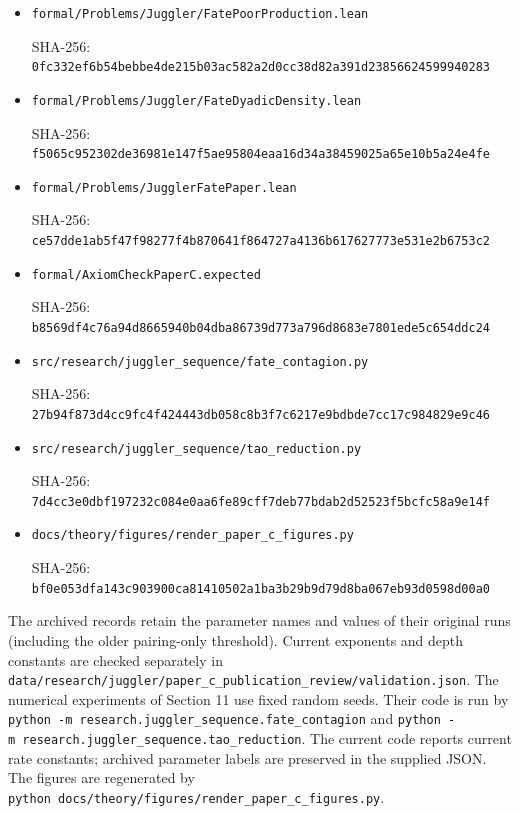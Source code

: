 \documentclass[11pt,a4paper]{article}
\begin{document}
\begin{itemize}
  SHA-256:
  \texttt{\nolinkurl{773c579e2ba303dc49f1488020ea142b0b35ea26573707ebfd6afca7c4dd284b}}
\item
  \texttt{\nolinkurl{formal/Problems/Juggler/FatePoorProduction.lean}}

  SHA-256:
  \texttt{\nolinkurl{0fc332ef6b54bebbe4de215b03ac582a2d0cc38d82a391d23856624599940283}}
\item
  \texttt{\nolinkurl{formal/Problems/Juggler/FateDyadicDensity.lean}}

  SHA-256:
  \texttt{\nolinkurl{f5065c952302de36981e147f5ae95804eaa16d34a38459025a65e10b5a24e4fe}}
\item
  \texttt{\nolinkurl{formal/Problems/JugglerFatePaper.lean}}

  SHA-256:
  \texttt{\nolinkurl{ce57dde1ab5f47f98277f4b870641f864727a4136b617627773e531e2b6753c2}}
\item
  \texttt{\nolinkurl{formal/AxiomCheckPaperC.expected}}

  SHA-256:
  \texttt{\nolinkurl{b8569df4c76a94d8665940b04dba86739d773a796d8683e7801ede5c654ddc24}}
\item
  \texttt{\nolinkurl{src/research/juggler_sequence/fate_contagion.py}}

  SHA-256:
  \texttt{\nolinkurl{27b94f873d4cc9fc4f424443db058c8b3f7c6217e9bdbde7cc17c984829e9c46}}
\item
  \texttt{\nolinkurl{src/research/juggler_sequence/tao_reduction.py}}

  SHA-256:
  \texttt{\nolinkurl{7d4cc3e0dbf197232c084e0aa6fe89cff7deb77bdab2d52523f5bcfc58a9e14f}}
\item
  \texttt{\nolinkurl{docs/theory/figures/render_paper_c_figures.py}}

  SHA-256:
  \texttt{\nolinkurl{bf0e053dfa143c903900ca81410502a1ba3b29b9d79d8ba067eb93d0598d00a0}}
\end{itemize}

The archived records retain the parameter names and values of their
original runs (including the older pairing-only threshold). Current
exponents and depth constants are checked separately in
\texttt{\nolinkurl{data/research/juggler/paper_c_publication_review/validation.json}}.
The numerical experiments of Section 11 use fixed random seeds. Their
code is run by
\texttt{python\ -m\ research.juggler\_sequence.fate\_contagion} and
\texttt{python\ -m\ research.juggler\_sequence.tao\_reduction}. The
current code reports current rate constants; archived parameter labels
are preserved in the supplied JSON. The figures are regenerated by
\texttt{python\ docs/theory/figures/render\_paper\_c\_figures.py}.
\end{document}
